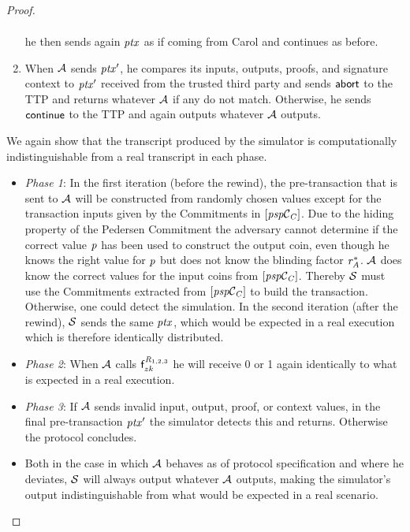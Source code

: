 \begin{proof}
\begin{enumerate}
\begin{gather*}
        \end{gather*}
        he then sends again $\mathit{ptx}$ as if coming from Carol and continues as before.
        \item When $\mathcal{A}$ sends ${\mathit{ptx}}'$, he compares its inputs, outputs, proofs, and signature context to ${\mathit{ptx}}'$ received from the trusted third party and sends $\mathsf{abort}$ to the TTP and returns whatever $\mathcal{A}$ if any do not match.
        Otherwise, he sends $\mathsf{continue}$ to the TTP and again outputs whatever $\mathcal{A}$ outputs.
    \end{enumerate}

    We again show that the transcript produced by the simulator is computationally indistinguishable from a real transcript in each phase.

    \begin{itemize}
        \item \textit{Phase 1}: In the first iteration (before the rewind), the pre-transaction that is sent to $\mathcal{A}$ will be constructed from randomly chosen values except for the transaction inputs given by the Commitments in $[\mathit{psp}\mathcal{C}_{\mathit{C}}]$.
        Due to the hiding property of the Pedersen Commitment the adversary cannot determine if the correct value $\mathit{p}$ has been used to construct the output coin, even though he knows the right value for $\mathit{p}$ but does not know the blinding factor $\mathit{r}_{\mathit{A}}^*$.
        $\mathcal{A}$ does know the correct values for the input coins from $[\mathit{psp}\mathcal{C}_{\mathit{C}}]$.
        Thereby $\mathcal{S}$ must use the Commitments extracted from $[\mathit{psp}\mathcal{C}_{\mathit{C}}]$ to build the transaction.
        Otherwise, one could detect the simulation.
        In the second iteration (after the rewind), $\mathcal{S}$ sends the same $\mathit{ptx}$, which would be expected in a real execution which is therefore identically distributed.
        \item \textit{Phase 2}: When $\mathcal{A}$ calls $\mathsf{f}^{\mathit{R}_{1,2,3}}_{zk}$ he will receive 0 or 1 again identically to what is expected in a real execution.
        \item \textit{Phase 3}: If $\mathcal{A}$ sends invalid input, output, proof, or context values, in the final pre-transaction ${\mathit{ptx}}'$ the simulator detects this and returns.
        Otherwise the protocol concludes.
        \item Both in the case in which $\mathcal{A}$ behaves as of protocol specification and where he deviates, $\mathcal{S}$ will always output whatever $\mathcal{A}$ outputs, making the simulator's output indistinguishable from what would be expected in a real scenario.
    \end{itemize}


\end{proof}
